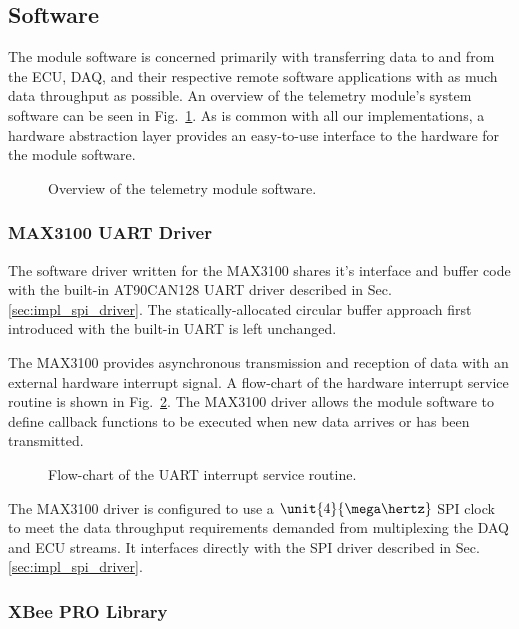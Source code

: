 \subsection{Software}

The module software is concerned primarily with transferring data to and from the ECU, DAQ, and their respective remote software applications with as much data throughput as possible. An overview of the telemetry module's system software can be seen in Fig.\ \ref{fig:telemetry_software_implementation}. As is common with all our implementations, a hardware abstraction layer provides an easy-to-use interface to the hardware for the module software.

\begin{figure}[H]
\centering

\caption{Overview of the telemetry module software.}
\label{fig:telemetry_software_implementation}
\end{figure}

\subsubsection{MAX3100 UART Driver}

The software driver written for the MAX3100 shares it's interface and buffer code with the built-in AT90CAN128 UART driver described in Sec. \ref{sec:impl_spi_driver}. The statically-allocated circular buffer approach first introduced with the built-in UART is left unchanged. 

The MAX3100 provides asynchronous transmission and reception of data with an external hardware interrupt signal. A flow-chart of the hardware interrupt service routine is shown in Fig.\ \ref{fig:usart_driver_flow}. The MAX3100 driver allows the module software to define callback functions to be executed when new data arrives or has been transmitted. 

\begin{figure}[H]
\centering

\caption{Flow-chart of the UART interrupt service routine.}
\label{fig:usart_driver_flow}
\end{figure}

The MAX3100 driver is configured to use a $\unit{4}{\mega\hertz}$ SPI clock to meet the data throughput requirements demanded from multiplexing the DAQ and ECU streams. It interfaces directly with the SPI driver described in Sec. \ref{sec:impl_spi_driver}.

\subsubsection{XBee PRO Library}

